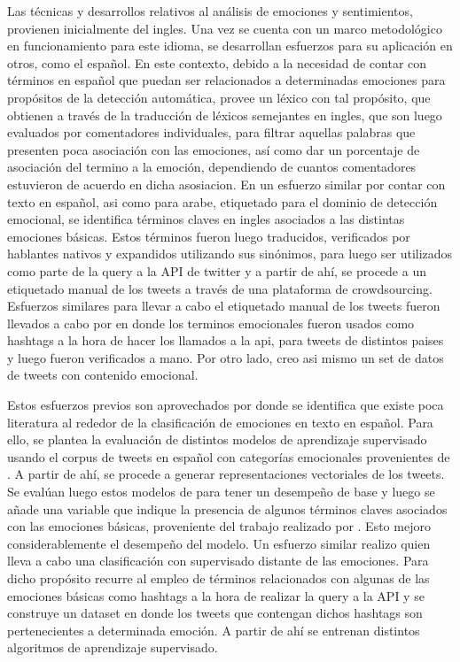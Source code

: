 Las técnicas y desarrollos relativos al análisis de emociones y sentimientos, provienen inicialmente del ingles. Una vez se cuenta con un marco metodológico en funcionamiento para este idioma, se desarrollan esfuerzos para su aplicación en otros, como el español. En este contexto, debido a la necesidad de contar con términos en español que puedan ser relacionados a determinadas emociones para propósitos de la detección automática, \cite{sidorov2012empirical} provee un léxico con tal propósito, que obtienen a través de la traducción de léxicos semejantes en ingles, que son luego evaluados por comentadores individuales, para filtrar aquellas palabras que presenten poca asociación con las emociones, así como dar un porcentaje de asociación del termino a la emoción, dependiendo de cuantos comentadores estuvieron de acuerdo en dicha asosiacion. En un esfuerzo similar por contar con texto en español, asi como para arabe, etiquetado para el dominio de detección emocional,\cite{mohammad2018semeval} se identifica términos claves en ingles asociados a las distintas emociones básicas. Estos términos fueron luego traducidos, verificados por hablantes nativos y expandidos utilizando sus sinónimos, para luego ser utilizados como parte de la query a la API de twitter y a partir de ahí, se procede a un etiquetado manual de los tweets a través de una plataforma de crowdsourcing. Esfuerzos similares para llevar a cabo el etiquetado manual de los tweets fueron llevados a cabo por \cite{sidorov2016construccion} en donde los terminos emocionales fueron usados como hashtags a la hora de hacer los llamados a la api, para tweets de distintos paises y luego fueron verificados a mano. Por otro lado, \cite{plaza2020emoevent} creo asi mismo un set de datos de tweets con contenido emocional.

Estos esfuerzos previos son aprovechados por \cite{plaza2020improved} donde se identifica que existe poca literatura al rededor de la clasificación de emociones en texto en español. Para ello, se plantea la evaluación de distintos modelos de aprendizaje supervisado usando el corpus de tweets en español con categorías emocionales provenientes de \cite{mohammad2018semeval}. A partir de ahí, se  procede a generar  representaciones vectoriales de los tweets. Se evalúan luego estos modelos de para tener un desempeño de base y luego se añade una variable que indique la presencia de algunos términos claves asociados con las emociones básicas, proveniente del trabajo realizado por \cite{sidorov2012empirical}. Esto mejoro considerablemente el desempeño del modelo. Un esfuerzo similar realizo \cite{gil2013combining} quien lleva a cabo una clasificación con supervisado distante de las emociones. Para dicho propósito recurre al empleo de términos relacionados con algunas de las emociones básicas como hashtags a la hora de realizar la query a la API y se construye un dataset en donde los tweets que contengan dichos hashtags son pertenecientes a determinada emoción. A partir de ahí se entrenan distintos algoritmos de aprendizaje supervisado.

